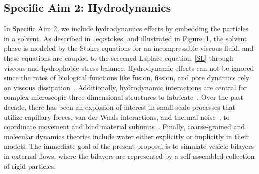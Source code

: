 \subsection{Specific Aim 2: Hydrodynamics}
\label{subsec:specific_aim_2}
In Specific Aim 2, we include hydrodynamics effects by embedding the
particles in a solvent.  As described in~\eqref{eq:stokes} and
illustrated in Figure~\ref{fig:flow_map}, the solvent phase is modeled
by the Stokes equations for an incompressible viscous fluid, and these
equations are coupled to the screened-Laplace equation~\eqref{SL}
through viscous and hydrophobic stress balance. Hydrodynamic effects can
not be ignored since the rates of biological functions like fusion,
fission, and pore dynamics rely on viscous
dissipation~\cite{RYHAM20112929}. 
Additionally, hydrodynamic interactions are central for complex
microscopic three-dimensional structures to fabricate~\cite{Cho2010}.
Over the past decade, there has been an explosion of interest in
small-scale processes that utilize capillary forces, van der Waals
interactions, and thermal noise~\cite{Zhang2017}, to coordinate movement
and bind material subunits~\cite{Pandey2011, Leong2007, Reynolds2019,
Dasgupta2017, Siontorou2017}. Finally, coarse-grained and molecular
dynamics theories include water either explicitly or implicitly in their
models. The immediate goal of the present proposal is to simulate
vesicle bilayers in external flows, where the bilayers are represented
by a self-assembled collection of rigid particles.

\begin{figure}[h]
    \caption{\label{fig:flow_map}}
\end{figure}


